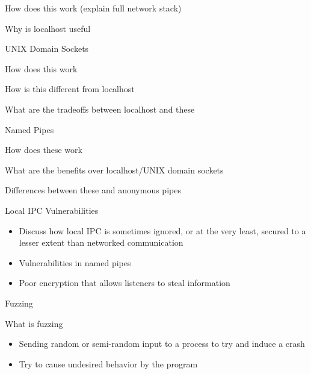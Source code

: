 \documentclass{article}
\begin{document}
\begin{outline}
\begin{outline}
\begin{outline}
\begin{outline}
                \begin{outline}
                    \item How does this work (explain full network stack)
                    \item Why is localhost useful
                \end{outline}
                \item UNIX Domain Sockets
                \begin{outline}
                    \item How does this work
                    \item How is this different from localhost
                    \item What are the tradeoffs between localhost and these
                \end{outline}
                \item Named Pipes
                \begin{outline}
                    \item How does these work
                    \item What are the benefits over localhost/UNIX domain sockets
                    \item Differences between these and anonymous pipes
                \end{outline}
            \end{outline}
            \item Local IPC Vulnerabilities
            \begin{itemize}
                \item Discuss how local IPC is sometimes ignored, or at the very least, secured to a lesser extent than networked communication
                \item Vulnerabilities in named pipes
                \item Poor encryption that allows listeners to steal information
            \end{itemize}
        \end{outline}
        \item Fuzzing
        \begin{outline}
            \item What is fuzzing
            \begin{itemize}
                \item Sending random or semi-random input to a process to try and induce a crash
                \item Try to cause undesired behavior by the program

\end{itemize}
\end{outline}
\end{outline}
\end{outline}
\end{document}
